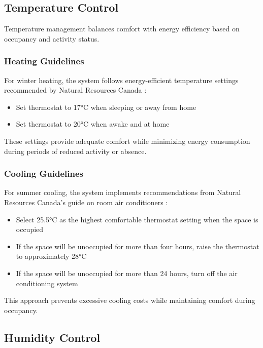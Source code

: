\documentclass{article}
\begin{document}
\subsection{Temperature Control}

Temperature management balances comfort with energy efficiency based on occupancy and activity status.

\subsubsection{Heating Guidelines}

For winter heating, the system follows energy-efficient temperature settings recommended by Natural Resources Canada \cite{nrcan_winter_heating}:

\begin{itemize}
    \item Set thermostat to 17°C when sleeping or away from home
    \item Set thermostat to 20°C when awake and at home
\end{itemize}

These settings provide adequate comfort while minimizing energy consumption during periods of reduced activity or absence.

\subsubsection{Cooling Guidelines}

For summer cooling, the system implements recommendations from Natural Resources Canada's guide on room air conditioners \cite{nrcan_cooling}:

\begin{itemize}
    \item Select 25.5°C as the highest comfortable thermostat setting when the space is occupied
    \item If the space will be unoccupied for more than four hours, raise the thermostat to approximately 28°C
    \item If the space will be unoccupied for more than 24 hours, turn off the air conditioning system
\end{itemize}

This approach prevents excessive cooling costs while maintaining comfort during occupancy.

\subsection{Humidity Control}
\end{document}
